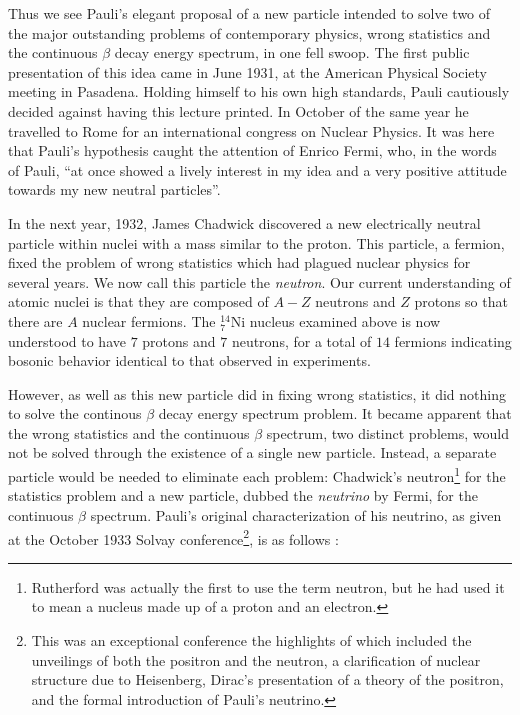 \documentclass[12pt]{book}
\begin{document}
Thus we see Pauli's elegant proposal of a new particle intended to solve two of the major outstanding problems of contemporary physics, wrong statistics and the continuous $\beta$ decay energy spectrum, in one fell swoop. The first public presentation of this idea came in June 1931, at the American Physical Society meeting in Pasadena. Holding himself to his own high standards, Pauli cautiously decided against having this lecture printed. In October of the same year he travelled to Rome for an international congress on Nuclear Physics. It was here that Pauli's hypothesis caught the attention of Enrico Fermi, who, in the words of Pauli\cite{pauli:writings}, ``at once showed a lively interest in my idea and a very positive attitude towards my new neutral particles''.

In the next year, 1932, James Chadwick discovered a new electrically neutral particle within nuclei with a mass similar to the proton. This particle, a fermion, fixed the problem of wrong statistics which had plagued nuclear physics for several years. We now call this particle the \textit{neutron}. Our current understanding of atomic nuclei is that they are composed of $A-Z$ neutrons and $Z$ protons so that there are $A$ nuclear fermions. The $^{14}_{7}$Ni nucleus examined above is now understood to have $7$ protons and $7$ neutrons, for a total of $14$ fermions indicating bosonic behavior identical to that observed in experiments.

However, as well as this new particle did in fixing wrong statistics, it did nothing to solve the continous $\beta$ decay energy spectrum problem. It became apparent that the wrong statistics and the continuous $\beta$ spectrum, two distinct problems, would not be solved through the existence of a single new particle. Instead, a separate particle would be needed to eliminate each problem: Chadwick's neutron\footnote{Rutherford was actually the first to use the term neutron, but he had used it
to mean a nucleus made up of a proton and an electron.} for the statistics problem and a new particle, dubbed the \emph{neutrino} by Fermi, for the continuous $\beta$ spectrum\cite{pauli:writings}. Pauli's original characterization of his neutrino, as given at the October 1933 Solvay conference\footnote{This was an exceptional conference the highlights of which included the unveilings of both the positron and the neutron, a clarification of nuclear structure due to Heisenberg, Dirac's presentation of a theory of the positron, and the formal introduction of Pauli's neutrino.}, is as follows \cite{solvay}:
\end{document}
